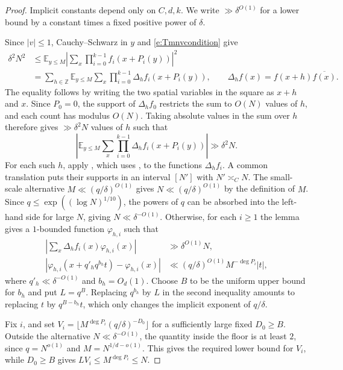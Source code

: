 \documentclass[12pt]{amsart}
\newcommand{\1}{\mathbf 1}
\theoremstyle{definition}
\begin{document}
\begin{proof}
Implicit constants depend only on \(C,d,k\). We write
\(\gg\delta^{O(1)}\) for a lower bound by a constant times a
fixed positive power of \(\delta\).

Since \(|v|\leq1\), Cauchy--Schwarz in \(y\) and \eqref{e:Tmnvcondition} give
\[
\begin{aligned}
 \delta^2N^2
 &\leq \mathbb E_{y\leq M}
     \left|\sum_x\prod_{i=0}^{k-1}f_i(x+P_i(y))\right|^2\\
 &=\sum_{h\in\mathbb Z}\mathbb E_{y\leq M}\sum_x
     \prod_{i=0}^{k-1}\Delta_h f_i(x+P_i(y)),
 \qquad
 \Delta_h f(x)=f(x+h)\overline{f(x)}.
\end{aligned}
\]
The equality follows by writing the two spatial variables in the
square as \(x+h\) and \(x\). Since \(P_0=0\), the support of
\(\Delta_h f_0\) restricts the sum to \(O(N)\) values of \(h\),
and each count has modulus \(O(N)\). Taking absolute values in
the sum over \(h\) therefore gives \(\gg\delta^2N\) values of \(h\) such that
$$\left\vert \mathbb E_{y\leq M}\sum_x
     \prod_{i=0}^{k-1}\Delta_h f_i(x+P_i(y))\right\vert \gg \delta^2 N.$$
For each such \(h\), apply \cite[Lemma~3.4]{KMTT}, which uses
\cite[Theorem~2.4]{ShaoWang}, to the functions \(\Delta_h f_i\).
A common translation puts their supports in an interval
\([N']\) with \(N'\asymp_C N\). The small-scale alternative
\(M\ll(q/\delta)^{O(1)}\) gives \(N\ll(q/\delta)^{O(1)}\) by the
definition of \(M\). Since \(q\leq\exp((\log N)^{1/10})\), the
powers of \(q\) can be absorbed into the left-hand side for
large \(N\), giving \(N\ll\delta^{-O(1)}\).
Otherwise, for each \(i\geq1\) the lemma gives a \(1\)-bounded
function \(\varphi_{h,i}\) such that
\begin{align}
 \left|\sum_x\Delta_h f_i(x)\varphi_{h,i}(x)\right|
   &\gg\delta^{O(1)}N,\nonumber\\
 |\varphi_{h,i}(x+q'_h q^{b_h}t)-\varphi_{h,i}(x)|
   &\ll(q/\delta)^{O(1)}M^{-\deg P_i}|t|, \label{e:d9ffbound1}
\end{align}
where \(q'_h\ll\delta^{-O(1)}\) and \(b_h=O_d(1)\). Choose \(B\)
to be the uniform upper bound for \(b_h\) and put \(L=q^B\).
Replacing \(q^{b_h}\) by \(L\) in the second inequality amounts
to replacing \(t\) by \(q^{B-b_h}t\), which only changes the
implicit exponent of \(q/\delta\).

Fix \(i\), and set
\(V_i=\lfloor M^{\deg P_i}(q/\delta)^{-D_0}\rfloor\) for a
sufficiently large fixed \(D_0\geq B\). Outside the alternative
\(N\ll\delta^{-O(1)}\), the quantity inside the floor is at least
\(2\), since \(q=N^{o(1)}\) and \(M=N^{1/d-o(1)}\). This gives
the required lower bound for \(V_i\), while \(D_0\geq B\) gives
\(LV_i\leq M^{\deg P_i}\leq N\).


\end{proof}
\end{document}
